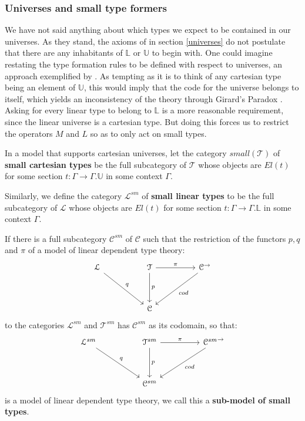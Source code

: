 \documentclass[a4paper,english]{lipics-v2018}
\begin{document}
\subsubsection{Universes and small type formers}\label{universesML}
We have not said anything about which types we expect to be contained in our universes. As they stand, the axioms of in section \ref{universes} do not postulate that there are any inhabitants of $\mathbb{L}$ or $\mathbb{U}$ to begin with. One could imagine restating the type formation rules to be defined with respect to universes, an approach exemplified by \cite{krishnaswami}. As tempting as it is to think of any cartesian type being an element of $\mathbb{U}$, this would imply that the code for the universe belongs to itself, which yields an inconsistency of the theory through Girard's Paradox \cite{hurkens}. Asking for every linear type to belong to $\mathbb{L}$ is a more reasonable requirement, since the linear universe is a cartesian type. But doing this forces us to restrict the operators $M$ and $L$ so as to only act on small types.
\begin{definition}In a model that supports cartesian universes, let the category $small(\mathcal{T})$ of \textbf{small cartesian types} be the full subcategory of $\mathcal{T}$ whose objects are $El(t)$ for some section $t : \Gamma \to \Gamma.\mathbb{U}$ in some context $\Gamma$.
\end{definition}
\begin{definition}
  Similarly, we define the category $\mathcal{L}^{sm}$ of \textbf{small linear types} to be the full subcategory of $\mathcal{L}$ whose objects are $El(t)$ for some section $t : \Gamma \to \Gamma.\mathbb{L}$ in some context $\Gamma$.
\end{definition}
\begin{definition}
  If there is a full subcategory $\mathcal{C}^{sm}$ of $\mathcal{C}$ such that the restriction of the functors $p, q$ and $\pi$ of a model of linear dependent type theory:
  \[
    \begin{tikzcd}[row sep=huge, column sep=huge]
    \mathcal{L} \ar[rd, "q"] & \mathcal{T}\ar[d, "p"] \ar[r, "\pi"] & \mathcal{C}^\to \ar[ld, "cod"]\\
    & \mathcal{C}
    \end{tikzcd}
  \]
  to the categories $\mathcal{L}^{sm}$ and $\mathcal{T}^{sm}$ has $\mathcal{C}^{sm}$ as its codomain, so that:
    \[
    \begin{tikzcd}[row sep=huge, column sep=huge]
    \mathcal{L}^{sm} \ar[rd, "q"] & \mathcal{T}^{sm}\ar[d, "p"] \ar[r, "\pi"] & {\mathcal{C}^{sm}}^\to \ar[ld, "cod"]\\
    & \mathcal{C}^{sm}
    \end{tikzcd}
  \]
  is a model of linear dependent type theory, we call this a \textbf{sub-model of small types}.
\end{definition}
\end{document}
